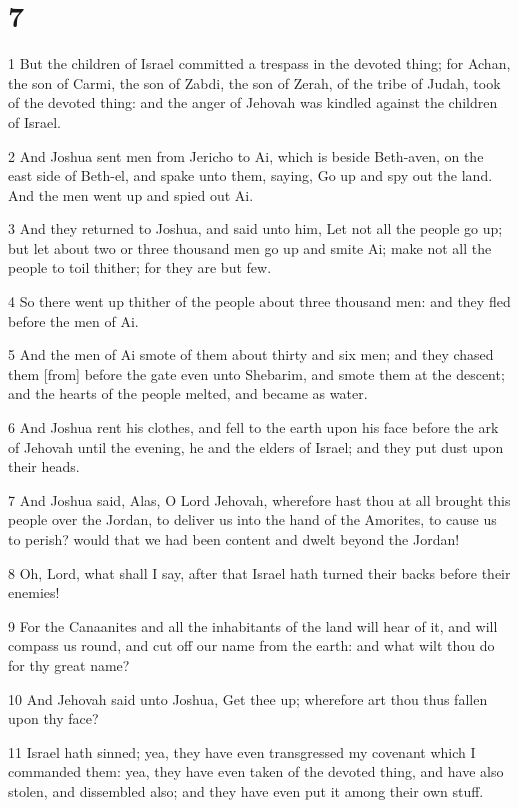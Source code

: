 \chapter{7}

\par 1 But the children of Israel committed a trespass in the devoted thing; for Achan, the son of Carmi, the son of Zabdi, the son of Zerah, of the tribe of Judah, took of the devoted thing: and the anger of Jehovah was kindled against the children of Israel.
\par 2 And Joshua sent men from Jericho to Ai, which is beside Beth-aven, on the east side of Beth-el, and spake unto them, saying, Go up and spy out the land. And the men went up and spied out Ai.
\par 3 And they returned to Joshua, and said unto him, Let not all the people go up; but let about two or three thousand men go up and smite Ai; make not all the people to toil thither; for they are but few.
\par 4 So there went up thither of the people about three thousand men: and they fled before the men of Ai.
\par 5 And the men of Ai smote of them about thirty and six men; and they chased them [from] before the gate even unto Shebarim, and smote them at the descent; and the hearts of the people melted, and became as water.
\par 6 And Joshua rent his clothes, and fell to the earth upon his face before the ark of Jehovah until the evening, he and the elders of Israel; and they put dust upon their heads.
\par 7 And Joshua said, Alas, O Lord Jehovah, wherefore hast thou at all brought this people over the Jordan, to deliver us into the hand of the Amorites, to cause us to perish? would that we had been content and dwelt beyond the Jordan!
\par 8 Oh, Lord, what shall I say, after that Israel hath turned their backs before their enemies!
\par 9 For the Canaanites and all the inhabitants of the land will hear of it, and will compass us round, and cut off our name from the earth: and what wilt thou do for thy great name?
\par 10 And Jehovah said unto Joshua, Get thee up; wherefore art thou thus fallen upon thy face?
\par 11 Israel hath sinned; yea, they have even transgressed my covenant which I commanded them: yea, they have even taken of the devoted thing, and have also stolen, and dissembled also; and they have even put it among their own stuff.

